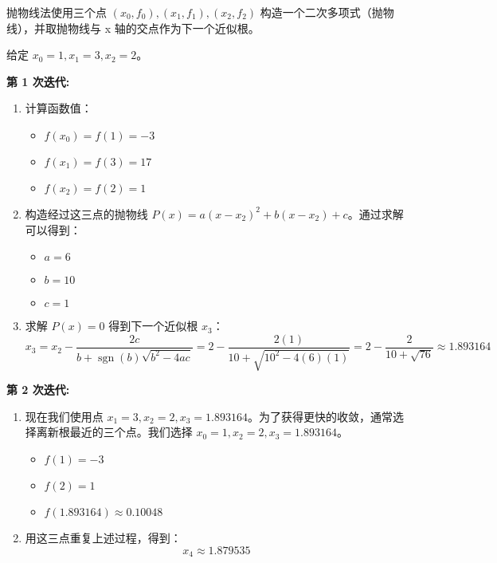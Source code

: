 \documentclass[11pt]{article}
\providecommand{\tightlist}{%
      \setlength{\itemsep}{0pt}\setlength{\parskip}{0pt}}
\begin{document}
抛物线法使用三个点 \((x_0, f_0), (x_1, f_1), (x_2, f_2)\)
构造一个二次多项式（抛物线），并取抛物线与 x 轴的交点作为下一个近似根。

给定 \(x_0 = 1, x_1 = 3, x_2 = 2\)。

\textbf{第 1 次迭代:}

\begin{enumerate}
\def\labelenumi{\arabic{enumi}.}
\tightlist
\item
  计算函数值：

  \begin{itemize}
  \tightlist
  \item
    \(f(x_0) = f(1) = -3\)
  \item
    \(f(x_1) = f(3) = 17\)
  \item
    \(f(x_2) = f(2) = 1\)
  \end{itemize}
\item
  构造经过这三点的抛物线
  \(P(x) = a(x-x_2)^2 + b(x-x_2) + c\)。通过求解可以得到：

  \begin{itemize}
  \tightlist
  \item
    \(a = 6\)
  \item
    \(b = 10\)
  \item
    \(c = 1\)
  \end{itemize}
\item
  求解 \(P(x)=0\) 得到下一个近似根 \(x_3\)：
  \[ x_3 = x_2 - \frac{2c}{b + \operatorname{sgn}(b)\sqrt{b^2 - 4ac}} = 2 - \frac{2(1)}{10 + \sqrt{10^2 - 4(6)(1)}} = 2 - \frac{2}{10 + \sqrt{76}} \approx 1.893164 \]
\end{enumerate}

\textbf{第 2 次迭代:}

\begin{enumerate}
\def\labelenumi{\arabic{enumi}.}
\tightlist
\item
  现在我们使用点
  \(x_1=3, x_2=2, x_3=1.893164\)。为了获得更快的收敛，通常选择离新根最近的三个点。我们选择
  \(x_0=1, x_2=2, x_3=1.893164\)。

  \begin{itemize}
  \tightlist
  \item
    \(f(1) = -3\)
  \item
    \(f(2) = 1\)
  \item
    \(f(1.893164) \approx 0.10048\)
  \end{itemize}
\item
  用这三点重复上述过程，得到： \[ x_4 \approx 1.879535 \]
\end{enumerate}
\end{document}
